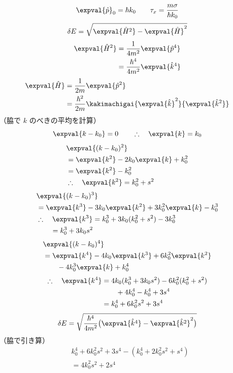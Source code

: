 \[ \expval{\hat{p}}_{0}=\hbar k_{0}\qquad\tau_{x}=\frac{m\sigma}{\hbar k_{0}} \]
\[ \delta E=\sqrt{\expval{\hat{H}^{2}}-\expval{\hat{H}}^{2}} \]
\begin{align*}
\expval{\hat{H}^{2}}&=\frac{1}{4m^{2}}\expval{\hat{p}^{4}}\\
&=\frac{\hbar^{4}}{4m^{2}}\expval{\hat{k}^{4}}
\end{align*}
\begin{align*}
\expval{\hat{H}}&=\frac{1}{2m}\expval{\hat{p}^{2}}\\
&=\frac{\hbar^{2}}{2m}\kakimachigai{\expval{\hat{k}}^{2}}{\expval{\hat{k}^{2}}}
\end{align*}
（脇で $k$ のべきの平均を計算）
\[ \expval{k-k_{0}}=0\qquad\therefore\quad\expval{k}=k_{0} \]
\begin{align*}
&\expval{(k-k_{0})^{2}}\\
&=\expval{k^{2}}-2k_{0}\expval{k}+k_{0}^{2}\\
&=\expval{k^{2}}-k_{0}^{2}\\
&\therefore\quad\expval{k^{2}}=k_{0}^{2}+s^{2}
\end{align*}
\begin{align*}
&\expval{(k-k_{0})^{3}}\\
&=\expval{k^{3}}-3k_{0}\expval{k^{2}}+3k_{0}^{2}\expval{k}-k_{0}^{3}\\
&\therefore\quad\expval{k^{3}}=k_{0}^{3}+3k_{0}(k_{0}^{2}+s^{2})-3k_{0}^{3}\\
&\qquad=k_{0}^{3}+3k_{0}s^{2}
\end{align*}
\begin{align*}
&\expval{(k-k_{0})^{4}}\\
&=\expval{k^{4}}-4k_{0}\expval{k^{3}}+6k_{0}^{2}\expval{k^{2}}\\
&\qquad-4k_{0}^{3}\expval{k}+k_{0}^{4}
\end{align*}
\begin{align*}
\therefore\quad\expval{k^{4}}&=4k_{0}(k_{0}^{3}+3k_{0}s^{2})-6k_{0}^{2}(k_{0}^{2}+s^{2})\\
&\qquad+4k_{0}^{4}-k_{0}^{4}+3s^{4}\\
&=k_{0}^{4}+6k_{0}^{2}s^{2}+3s^{4}
\end{align*}
\[ \delta E=\sqrt{\frac{\hbar^{4}}{4m^{2}}\bigl(\expval{\hat{k}^{4}}-\expval{\hat{k}^{2}}^{2}\bigr)} \]
（脇で引き算）
\begin{align*}
&k_{0}^{4}+6k_{0}^{2}s^{2}+3s^{4}-(k_{0}^{4}+2k_{0}^{2}s^{2}+s^{4})\\
&=4k_{0}^{2}s^{2}+2s^{4}
\end{align*}
